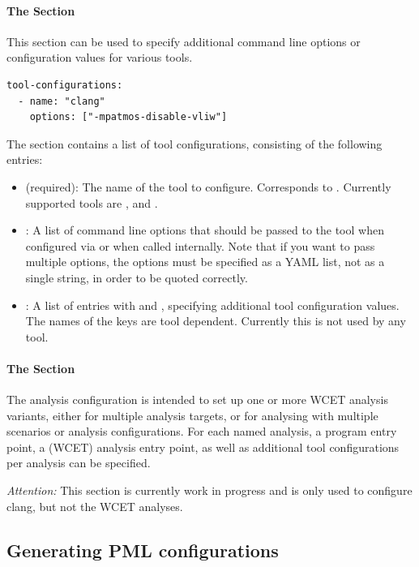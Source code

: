 \paragraph{The  Section}

This section can be used to specify additional command line options or configuration values for various tools.

\begin{verbatim}
tool-configurations:
  - name: "clang"
    options: ["-mpatmos-disable-vliw"]
\end{verbatim}

The section contains a list of tool configurations, consisting of the following entries:
\begin{itemize}
\item {} (required): The name of the tool to configure. Corresponds to . Currently supported
  tools are ,  and . 
\item {}: A list of command line options that should be passed to the tool when configured via  or 
  when called internally. Note that if you want to pass multiple options, the options must be specified as a YAML list, not as a 
  single string, in order to be quoted correctly.
\item {}: A list of entries with  and , specifying additional tool configuration values.
  The names of the keys are tool dependent. 
  Currently this is not used by any tool.
\end{itemize}

\paragraph{The  Section}

The analysis configuration is intended to set up one or more WCET analysis variants, either for 
multiple analysis targets, or for analysing with multiple scenarios or analysis configurations.
For each named analysis, a program entry point, a (WCET) analysis entry point, as well as additional tool configurations
per analysis can be specified.

\emph{Attention:} This section is currently work in progress and is only used to configure clang, but not the WCET analyses.


\subsection{Generating PML configurations}

